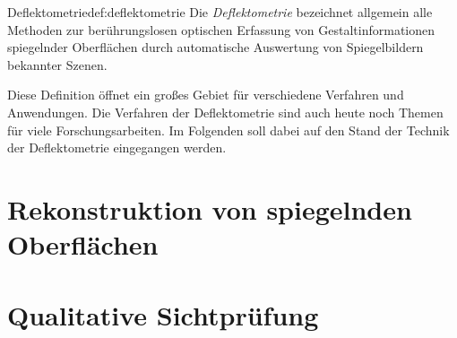 \begin{Definition}{Deflektometrie}{def:deflektometrie}
	Die \textit{Deflektometrie} bezeichnet allgemein alle Methoden zur berührungslosen optischen Erfassung von Gestaltinformationen spiegelnder Oberflächen durch automatische Auswertung von Spiegelbildern bekannter Szenen. \cite{fraunhofer}
\end{Definition}

\noindent
Diese Definition öffnet ein großes Gebiet für verschiedene Verfahren und Anwendungen.
Die Verfahren der Deflektometrie sind auch heute noch Themen für viele Forschungsarbeiten.
Im Folgenden soll dabei auf den Stand der Technik der Deflektometrie eingegangen werden.

{
	\FloatBarrier
    \section{Rekonstruktion von spiegelnden Oberflächen}
    \label{sub:rekonstruktion}
    
}

{
	\FloatBarrier
    \section{Qualitative Sichtprüfung}
    \label{sub:qualitativeSichtpruefung}
    
}